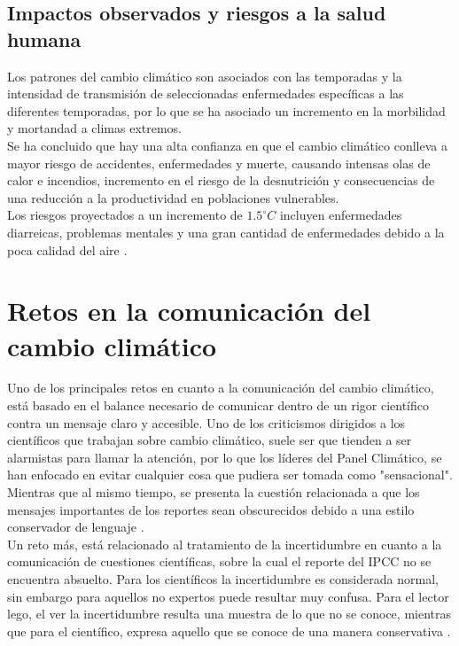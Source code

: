 \documentclass{article}
\begin{document}
\subsection{Impactos observados y riesgos a la salud humana}
Los patrones del cambio climático son asociados con las temporadas y la intensidad de transmisión de seleccionadas enfermedades específicas a las diferentes temporadas, por lo que se ha asociado un incremento en la morbilidad y mortandad a climas extremos.
\\
Se ha concluido que hay una alta confianza en que el cambio climático conlleva a mayor riesgo de accidentes, enfermedades y muerte, causando intensas olas de calor e incendios, incremento en el riesgo de la desnutrición y consecuencias de una reducción a la productividad en poblaciones vulnerables.
\\
Los riesgos proyectados a un incremento de $1.5^{\circ}C$ incluyen enfermedades diarreicas, problemas mentales y una gran cantidad de enfermedades debido a la poca calidad del aire \cite{Hoegh}.
\section{Retos en la comunicación del cambio climático}
Uno de los principales retos en cuanto a la comunicación del cambio climático, está basado en el balance necesario de comunicar dentro de un rigor científico contra un mensaje claro y accesible. Uno de los criticismos dirigidos a los científicos que trabajan sobre cambio climático, suele ser que tienden a ser alarmistas para llamar la atención, por lo que los líderes del Panel Climático, se han enfocado en evitar cualquier cosa que pudiera ser tomada como "sensacional". Mientras que al mismo tiempo, se presenta la cuestión relacionada a que los mensajes importantes de los reportes sean obscurecidos debido a una estilo conservador de lenguaje \cite{Lynn}.
\\
Un reto más, está relacionado al tratamiento de la incertidumbre en cuanto a la comunicación de cuestiones científicas, sobre la cual el reporte del IPCC no se encuentra absuelto. Para los científicos la incertidumbre es considerada normal, sin embargo para aquellos no expertos puede resultar muy confusa. Para el lector lego, el ver la incertidumbre resulta una muestra de lo que no se conoce, mientras que para el científico, expresa aquello que se conoce de una manera conservativa \cite{Lynn}.
\end{document}

